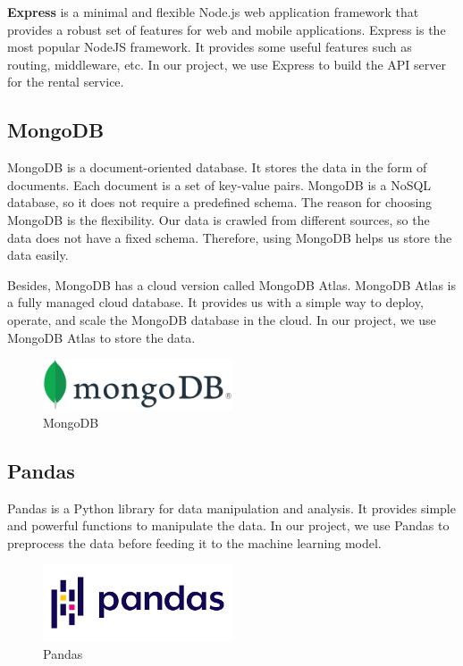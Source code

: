 \textbf{Express} is a minimal and flexible Node.js web application framework that provides a robust set of features for web and mobile applications. Express is the most popular NodeJS framework. It provides some useful features such as routing, middleware, etc. In our project, we use Express to build the API server for the rental service.

\subsection{MongoDB}
MongoDB is a document-oriented database. It stores the data in the form of documents. Each document is a set of key-value pairs. MongoDB is a NoSQL database, so it does not require a predefined schema. The reason for choosing MongoDB is the flexibility. Our data is crawled from different sources, so the data does not have a fixed schema. Therefore, using MongoDB helps us store the data easily.

Besides, MongoDB has a cloud version called MongoDB Atlas. MongoDB Atlas is a fully managed cloud database. It provides us with a simple way to deploy, operate, and scale the MongoDB database in the cloud. In our project, we use MongoDB Atlas to store the data.

\begin{figure}[ht]
    \centering
    \includegraphics[width=0.5\textwidth]{../Images/8.Technology_Stack/mongodb_logo.png}
    \caption{MongoDB}
    \label{fig:mongodb}
\end{figure}


\subsection{Pandas}
Pandas is a Python library for data manipulation and analysis. It provides simple and powerful functions to manipulate the data. In our project, we use Pandas to preprocess the data before feeding it to the machine learning model.

\begin{figure}[ht]
    \centering
    \includegraphics[width=0.5\textwidth]{../Images/8.Technology_Stack/pandas_logo.png}
    \caption{Pandas}
    \label{fig:pandas} 
\end{figure}

